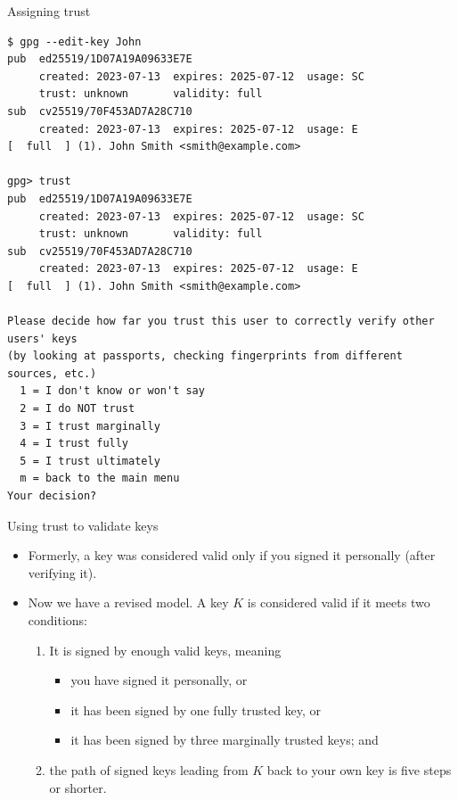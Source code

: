 \documentclass[
mode=present,
paper=smartboard,
size=20pt,
]{powerdot}
\begin{document}
\makeatletter\renewcommand{\verbatim@font}{\scriptsize\tt}\makeatother
\begin{slide}[method=direct]{Assigning trust}
\vspace{-10mm}
\begin{verbatim}
$ gpg --edit-key John
pub  ed25519/1D07A19A09633E7E
     created: 2023-07-13  expires: 2025-07-12  usage: SC  
     trust: unknown       validity: full
sub  cv25519/70F453AD7A28C710
     created: 2023-07-13  expires: 2025-07-12  usage: E   
[  full  ] (1). John Smith <smith@example.com>

gpg> trust
pub  ed25519/1D07A19A09633E7E
     created: 2023-07-13  expires: 2025-07-12  usage: SC  
     trust: unknown       validity: full
sub  cv25519/70F453AD7A28C710
     created: 2023-07-13  expires: 2025-07-12  usage: E   
[  full  ] (1). John Smith <smith@example.com>

Please decide how far you trust this user to correctly verify other users' keys
(by looking at passports, checking fingerprints from different sources, etc.)
  1 = I don't know or won't say
  2 = I do NOT trust
  3 = I trust marginally
  4 = I trust fully
  5 = I trust ultimately
  m = back to the main menu
Your decision?
\end{verbatim}
\end{slide}

\begin{slide}{Using trust to validate keys}
  \begin{itemize}
  \item Formerly, a key was considered valid only if you signed it
    personally (after verifying it).
  \item Now we have a revised model.  A key $K$ is considered valid if
    it meets two conditions:
    \begin{enumerate}
    \item It is signed by enough valid keys, meaning
      \begin{itemize}
      \item you have signed it personally, or
      \item it has been signed by one fully trusted key, or
      \item it has been signed by three marginally trusted keys; and
      \end{itemize}
    \item the path of signed keys leading from $K$ back to your own
      key is five steps or shorter.
    \end{enumerate}
  \end{itemize}
\end{slide}
\end{document}
